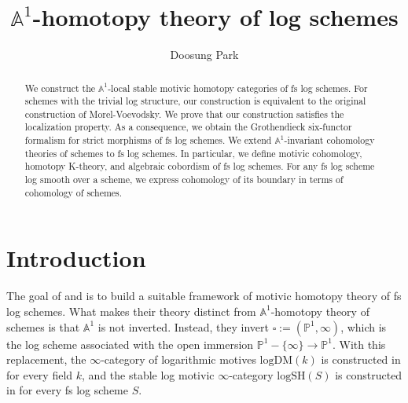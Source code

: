 \documentclass[10pt]{amsart}
\theoremstyle{definition}
\theoremstyle{remark}
\numberwithin{equation}{subsection}
\newcommand{\A}{\mathbb{A}}
\renewcommand{\P}{\mathbb{P}}
\newcommand{\boxx}{\square}
\newcommand{\logSH}{\mathrm{logSH}}
\newcommand{\logDM}{\mathrm{log}{\mathrm{DM}}}
\begin{document}
\title{$\A^1$-homotopy theory of log schemes}
\author{Doosung Park}
\address{Bergische Universit{\"a}t Wuppertal,
Fakult{\"a}t Mathematik und Naturwissenschaften
\\
Gau{\ss}strasse 20, 42119 Wuppertal, Germany}

\begin{abstract}We construct the $\mathbb{A}^1$-local stable motivic homotopy categories of fs log schemes.
For schemes with the trivial log structure, our construction is equivalent to the original construction of Morel-Voevodsky.
We prove that our construction satisfies the localization property.
As a consequence, we obtain the Grothendieck six-functor formalism for strict morphisms of fs log schemes.
We extend $\mathbb{A}^1$-invariant cohomology theories of schemes to fs log schemes.
In particular, we define motivic cohomology, homotopy K-theory, and algebraic cobordism of fs log schemes.
For any fs log scheme log smooth over a scheme, we express cohomology of its boundary in terms of cohomology of schemes.
\end{abstract}





\maketitle






\section{Introduction}

The goal of \cite{logDM} and \cite{logSH} is to build a suitable framework of motivic homotopy theory of fs log schemes.
What makes their theory distinct from $\A^1$-homotopy theory of schemes \cite{MV} is that $\A^1$ is not inverted.
Instead, they invert $\boxx:=(\P^1,\infty)$, which is the log scheme associated with the open immersion $\P^1-\{\infty\}\to \P^1$.
With this replacement,
the $\infty$-category of logarithmic motives $\logDM(k)$ is constructed in \cite{logDM} for every field $k$, and the stable log motivic $\infty$-category $\logSH(S)$ is constructed in \cite{logSH} for every fs log scheme $S$.

\
\end{document}
